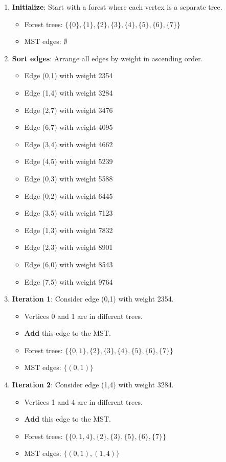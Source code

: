 \documentclass{article}
\theoremstyle{definition}
\begin{document}
\begin{enumerate}
\item \textbf{Initialize}: Start with a forest where each vertex is a separate tree.
   \begin{itemize}
   \item Forest trees: $\{\{0\}, \{1\}, \{2\}, \{3\}, \{4\}, \{5\}, \{6\}, \{7\}\}$
   \item MST edges: $\emptyset$
   \end{itemize}

\item \textbf{Sort edges}: Arrange all edges by weight in ascending order.
   \begin{itemize}
   \item Edge (0,1) with weight 2354
   \item Edge (1,4) with weight 3284
   \item Edge (2,7) with weight 3476
   \item Edge (6,7) with weight 4095
   \item Edge (3,4) with weight 4662
   \item Edge (4,5) with weight 5239
   \item Edge (0,3) with weight 5588
   \item Edge (0,2) with weight 6445
   \item Edge (3,5) with weight 7123
   \item Edge (1,3) with weight 7832
   \item Edge (2,3) with weight 8901
   \item Edge (6,0) with weight 8543
   \item Edge (7,5) with weight 9764
   \end{itemize}

\item \textbf{Iteration 1}: Consider edge (0,1) with weight 2354.
   \begin{itemize}
   \item Vertices 0 and 1 are in different trees.
   \item \textbf{Add} this edge to the MST.
   \item Forest trees: $\{\{0,1\}, \{2\}, \{3\}, \{4\}, \{5\}, \{6\}, \{7\}\}$
   \item MST edges: $\{(0,1)\}$
   \end{itemize}

\item \textbf{Iteration 2}: Consider edge (1,4) with weight 3284.
   \begin{itemize}
   \item Vertices 1 and 4 are in different trees.
   \item \textbf{Add} this edge to the MST.
   \item Forest trees: $\{\{0,1,4\}, \{2\}, \{3\}, \{5\}, \{6\}, \{7\}\}$
   \item MST edges: $\{(0,1), (1,4)\}$
   \end{itemize}


\end{enumerate}
\end{document}
